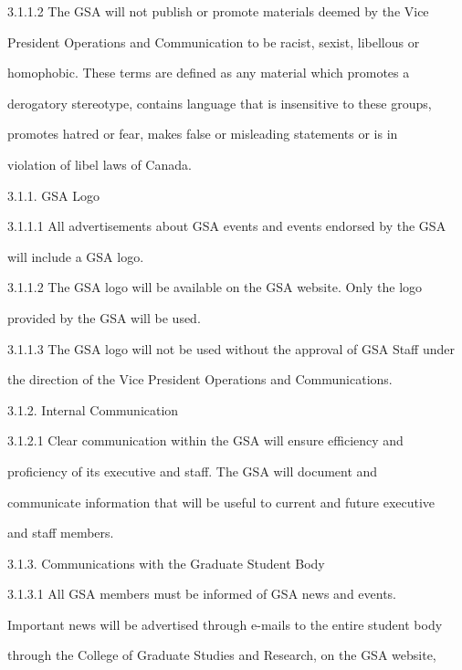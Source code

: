   

3.1.1.2           The GSA will not publish or promote materials deemed by the Vice  

         President  Operations  and  Communication  to  be  racist,  sexist,  libellous  or  

         homophobic.  These  terms  are  defined  as  any  material  which  promotes  a  

         derogatory stereotype, contains language that is insensitive to these groups,  

         promotes  hatred  or  fear,  makes  false  or  misleading  statements  or  is  in  

         violation of libel laws of Canada.   

  

3.1.1. GSA Logo   

3.1.1.1      All advertisements about GSA events and events endorsed by the GSA  

             will include a GSA logo.   

3.1.1.2      The  GSA  logo  will  be  available  on  the  GSA  website.  Only  the  logo  

             provided by the GSA will be used.   

3.1.1.3      The GSA logo will not be used without the approval of GSA Staff under  

             the direction of the Vice President Operations and Communications.   

  

3.1.2. Internal Communication  

3.1.2.1   Clear   communication   within   the   GSA   will   ensure   efficiency   and  

         proficiency   of   its   executive   and   staff.   The   GSA   will   document   and  

         communicate information that will be useful to current and future executive  

         and staff members.  

  

3.1.3. Communications with the Graduate Student Body  

  

3.1.3.1           All  GSA  members  must  be  informed  of  GSA  news  and  events.  

         Important news will be advertised through e-mails to the entire student body  

         through the College of Graduate Studies and Research, on the GSA website,  

